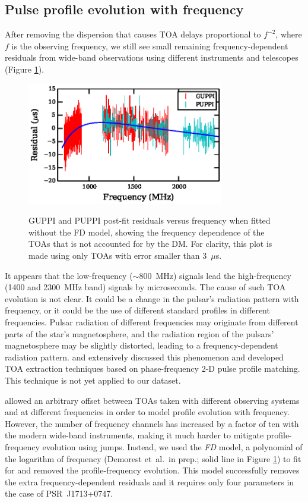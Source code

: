\subsection{Pulse profile evolution with frequency}
\label{sec:FD}
After removing the dispersion that causes TOA delays proportional to $f^{-2}$,
where $f$ is the observing frequency,
 we still see small remaining frequency-dependent residuals from wide-band
observations using
different instruments and telescopes (Figure \ref{fig:FD}). 
%
\begin{figure}
\includegraphics[width=3.4in]{FD.ps} \\ 
\caption {\label{fig:FD} GUPPI and PUPPI post-fit residuals versus frequency when fitted
without the FD model, showing the frequency dependence of the TOAs that is 
not accounted for by the DM. For
clarity, this plot is made using only TOAs with error smaller than 3~$\mu$s.} 
\end{figure} 
% 
It appears that the low-frequency ($\sim$800~MHz) signals lead the
high-frequency (1400 and 2300~MHz band) signals by microseconds.
The cause of such TOA evolution is not clear. It could be a change in the pulsar's
radiation pattern with frequency, or it could be the use of different
standard profiles in different frequencies. Pulsar radiation of different frequencies may originate from
different parts of the star's magnetosphere, and 
the radiation region of the pulsars' magnetosphere may be slightly distorted,
leading to a frequency-dependent radiation pattern. \citet{pdr14} and \citet{ldc+14} 
extensively discussed this phenomenon and developed TOA extraction techniques
based on phase-frequency 2-D pulse profile matching. This technique is not
yet applied to our dataset.

\citet{dfg+13} allowed an arbitrary offset between TOAs taken with different
observing systems and at different frequencies in order to model profile
evolution with frequency.
However, the number of frequency
channels has increased by a factor of ten with the modern wide-band
instruments, making it much harder to mitigate profile-frequency evolution using jumps. 
Instead, we used the {\it FD} model, a polynomial of the logarithm of
frequency (Demorest et~al.\ in prep.; solid line in Figure
\ref{fig:FD}) to fit for and removed the profile-frequency
evolution. This model successfully removes the extra
frequency-dependent residuals and it requires only four parameters in the
case of PSR~J1713+0747.


